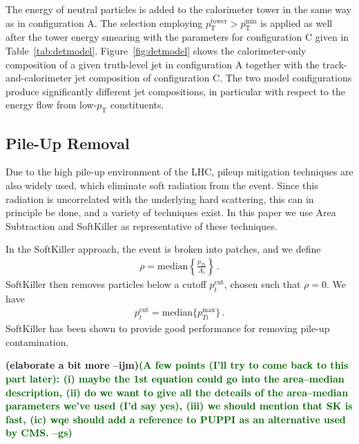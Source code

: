 \documentclass[11pt,letterpaper]{article}
\newcommand{\pt}{\ensuremath{p_{\text{T}}}}
\newcommand{\ptmin}{\ensuremath{p_{\text{T}}^{\text{min}}}}
\newcommand{\pttower}{\ensuremath{p_{\text{T}}^{\text{tower}}}}
\newcommand{\ijm}[1]{\textbf{\textcolor{llblue}{(#1 --ijm)}}}
\newcommand{\gs}[1]{\textbf{\textcolor{darkgreen}{(#1 --gs)}}}
\begin{document}
The energy of neutral particles is added to the calorimeter tower in the same way as in configuration A. 
The selection employing $\pttower > \ptmin$ is applied as well after the tower energy smearing with the parameters for configuration C given in Table~\ref{tab:detmodel}. 
Figure~\ref{fig:detmodel} shows the calorimeter-only composition of a given truth-level jet in configuration A together with the track-and-calorimeter jet composition of configuration C.
The two model configurations produce significantly different jet compositions, in particular with respect to the energy flow from low-\pt{} constituents.










\subsection{Pile-Up Removal}\label{sec:pu_tech}

Due to the high pile-up environment of the LHC, pileup mitigation techniques \cite{Cacciari:2007fd,Alon:2011xb,Soyez:2012hv,Tseng:2013dva,Krohn:2013lba,Cacciari:2014gra,Bertolini:2014bba} are also widely used, which eliminate soft radiation from the event.
%
Since this radiation is uncorrelated with the underlying hard scattering, this can in principle be done, and a variety of techniques exist.
%
In this paper we use Area Subtraction \cite{Cacciari:2007fd,Cacciari:2008gn} and SoftKiller \cite{Cacciari:2014gra} as representative of these techniques.

In the SoftKiller approach, the event is broken into patches, and we define
\begin{align}
\rho= \text{median} \left \{ \frac{p_{Ti}}{A_i}   \right \}\,.
\end{align}
SoftKiller then removes particles below a cutoff $p_t^{\text{cut}}$, chosen such that $\rho=0$. We have
\begin{align}
p_t^{\text{cut}}=\text{median} \{ p_{Ti}^{\text{max}} \}\,.
\end{align}
SoftKiller has been shown to provide good performance for removing pile-up contamination.

\ijm{elaborate a bit more}\gs{A few points (I'll try to come back to
  this part later): (i) maybe the 1st equation could go into the
  area--median description, (ii) do we want to give all the deteails
  of the area--median parameters we've used (I'd say yes), (iii) we
  should mention that SK is fast, (ic) wqe should add a reference to
  PUPPI as an alternative used by CMS.}
\end{document}
